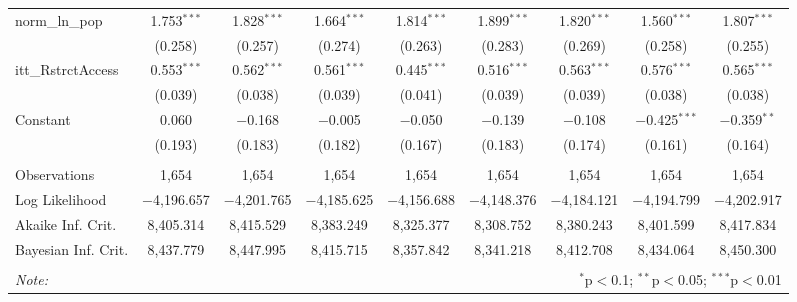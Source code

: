 \begin{sidewaystable}[!htbp]
\begin{tabular}{@{\extracolsep{5pt}}lcccccccc}
  norm\_ln\_pop & 1.753$^{***}$ & 1.828$^{***}$ & 1.664$^{***}$ & 1.814$^{***}$ & 1.899$^{***}$ & 1.820$^{***}$ & 1.560$^{***}$ & 1.807$^{***}$ \\ 
  & (0.258) & (0.257) & (0.274) & (0.263) & (0.283) & (0.269) & (0.258) & (0.255) \\ 
  itt\_RstrctAccess & 0.553$^{***}$ & 0.562$^{***}$ & 0.561$^{***}$ & 0.445$^{***}$ & 0.516$^{***}$ & 0.563$^{***}$ & 0.576$^{***}$ & 0.565$^{***}$ \\ 
  & (0.039) & (0.038) & (0.039) & (0.041) & (0.039) & (0.039) & (0.038) & (0.038) \\ 
  Constant & 0.060 & $-$0.168 & $-$0.005 & $-$0.050 & $-$0.139 & $-$0.108 & $-$0.425$^{***}$ & $-$0.359$^{**}$ \\ 
  & (0.193) & (0.183) & (0.182) & (0.167) & (0.183) & (0.174) & (0.161) & (0.164) \\ 
 \hline \\[-1.8ex] 
Observations & 1,654 & 1,654 & 1,654 & 1,654 & 1,654 & 1,654 & 1,654 & 1,654 \\ 
Log Likelihood & $-$4,196.657 & $-$4,201.765 & $-$4,185.625 & $-$4,156.688 & $-$4,148.376 & $-$4,184.121 & $-$4,194.799 & $-$4,202.917 \\ 
Akaike Inf. Crit. & 8,405.314 & 8,415.529 & 8,383.249 & 8,325.377 & 8,308.752 & 8,380.243 & 8,401.599 & 8,417.834 \\ 
Bayesian Inf. Crit. & 8,437.779 & 8,447.995 & 8,415.715 & 8,357.842 & 8,341.218 & 8,412.708 & 8,434.064 & 8,450.300 \\ 
\hline 
\hline \\[-1.8ex] 
\textit{Note:}  & \multicolumn{8}{r}{$^{*}$p$<$0.1; $^{**}$p$<$0.05; $^{***}$p$<$0.01} \\ 
\end{tabular} 
\end{sidewaystable} 
